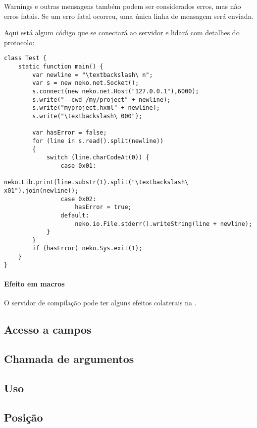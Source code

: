 Warnings e outras mensagens também podem ser considerados erros, mas não erros fatais. Se um erro fatal ocorreu, uma única linha de mensagem  será enviada.

Aqui está algum código que se conectará ao servidor e lidará com detalhes do protocolo:

\begin{lstlisting}
class Test {
    static function main() {
		var newline = "\textbackslash\ n";
        var s = new neko.net.Socket();
        s.connect(new neko.net.Host("127.0.0.1"),6000);
        s.write("--cwd /my/project" + newline);
        s.write("myproject.hxml" + newline);
        s.write("\textbackslash\ 000");
		
        var hasError = false;
        for (line in s.read().split(newline))
		{
            switch (line.charCodeAt(0)) {
				case 0x01: 
					neko.Lib.print(line.substr(1).split("\textbackslash\ x01").join(newline));
				case 0x02: 
					hasError = true;
				default: 
					neko.io.File.stderr().writeString(line + newline);
            }
		}
        if (hasError) neko.Sys.exit(1);
    }
}
\end{lstlisting}

\paragraph{Efeito em macros}
O servidor de compilação pode ter alguns efeitos colaterais na .

\subsection{Acesso a campos}
\label{cr-completion-field-access}

\subsection{Chamada de argumentos}
\label{cr-completion-call-arguments}

\subsection{Uso}
\label{cr-completion-usage}

\subsection{Posição}
\label{cr-completion-position}

